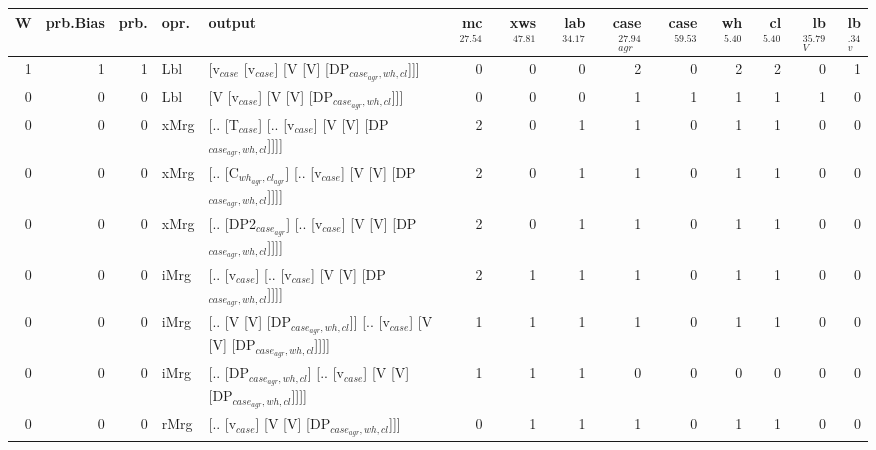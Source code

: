 \begin{tabularx}{\linewidth}{rrrlXrrrrrrrrr}
\hline
   W &   prb.Bias &   prb. & opr.   & output                                                                     &   mc$^{27.54}$ &   xws$^{47.81}$ &   lab$^{34.17}$ &   case$_{agr}^{27.94}$ &   case$^{59.53}$ &   wh$^{5.40}$ &   cl$^{5.40}$ &   lb$_{V}^{35.79}$ &   lb$_{v}^{.34}$ \\
\hline
   1 &       1 &   1 & Lbl  & [v$_{case}$ [v$_{case}$] [V [V] [DP$_{case_{agr},wh,cl}$]]]                              &            0 &             0 &             0 &                  2 &              0 &           2 &           2 &              0 &             1 \\
   0 &       0 &   0 & Lbl  & [V [v$_{case}$] [V [V] [DP$_{case_{agr},wh,cl}$]]]                                   &            0 &             0 &             0 &                  1 &              1 &           1 &           1 &              1 &             0 \\
   0 &       0 &   0 & xMrg & [.. [T$_{case}$] [.. [v$_{case}$] [V [V] [DP$_{case_{agr},wh,cl}$]]]]                    &            2 &             0 &             1 &                  1 &              0 &           1 &           1 &              0 &             0 \\
   0 &       0 &   0 & xMrg & [.. [C$_{wh_{agr},cl_{agr}}$] [.. [v$_{case}$] [V [V] [DP$_{case_{agr},wh,cl}$]]]]           &            2 &             0 &             1 &                  1 &              0 &           1 &           1 &              0 &             0 \\
   0 &       0 &   0 & xMrg & [.. [DP2$_{case_{agr}}$] [.. [v$_{case}$] [V [V] [DP$_{case_{agr},wh,cl}$]]]]              &            2 &             0 &             1 &                  1 &              0 &           1 &           1 &              0 &             0 \\
   0 &       0 &   0 & iMrg & [.. [v$_{case}$] [.. [v$_{case}$] [V [V] [DP$_{case_{agr},wh,cl}$]]]]                    &            2 &             1 &             1 &                  1 &              0 &           1 &           1 &              0 &             0 \\
   0 &       0 &   0 & iMrg & [.. [V [V] [DP$_{case_{agr},wh,cl}$]] [.. [v$_{case}$] [V [V] [DP$_{case_{agr},wh,cl}$]]]] &            1 &             1 &             1 &                  1 &              0 &           1 &           1 &              0 &             0 \\
   0 &       0 &   0 & iMrg & [.. [DP$_{case_{agr},wh,cl}$] [.. [v$_{case}$] [V [V] [DP$_{case_{agr},wh,cl}$]]]]         &            1 &             1 &             1 &                  0 &              0 &           0 &           0 &              0 &             0 \\
   0 &       0 &   0 & rMrg & [.. [v$_{case}$] [V [V] [DP$_{case_{agr},wh,cl}$]]]                                  &            0 &             1 &             1 &                  1 &              0 &           1 &           1 &              0 &             0 \\
\hline
\end{tabularx}\endgroup\\
